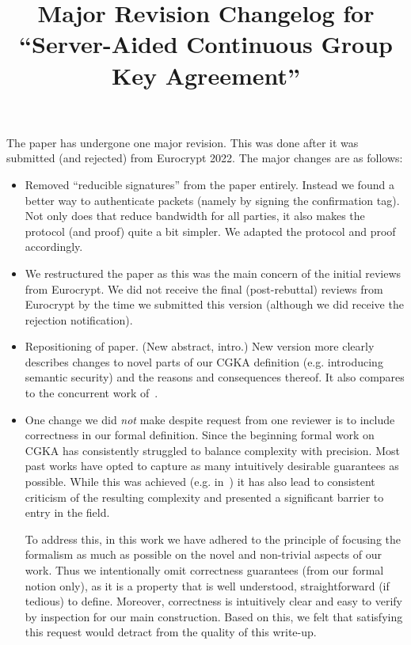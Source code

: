 \documentclass[letterpaper,10pt]{article}
\title{Major Revision Changelog for ``Server-Aided Continuous Group Key Agreement''}
\author{
} %
\begin{document}
{
	\def\addcontentsline#1#2#3{}
	\maketitle }

The paper has undergone one major revision. This was done after it was
submitted (and rejected) from Eurocrypt 2022. The major changes are as
follows:
\begin{itemize}
\item Removed ``reducible signatures'' from the paper entirely. Instead we
    found a better way to authenticate packets (namely by signing the
    confirmation tag). Not only does that reduce bandwidth for all parties,
    it also makes the protocol (and proof) quite a bit simpler.  We adapted
    the protocol and proof accordingly.
\item We restructured the paper as this was the main concern of the initial
    reviews from Eurocrypt. We did not receive the final (post-rebuttal)
    reviews from Eurocrypt by the time we submitted this version (although
    we did receive the rejection notification).
\item Repositioning of paper. (New abstract, intro.) New version more
    clearly describes changes to novel parts of our CGKA definition (e.g.
    introducing semantic security) and the reasons and consequences
    thereof. It also compares to the concurrent work
    of~\cite{hashimoto2021cmpke}.
\item One change we did \emph{not} make despite request from one reviewer
    is to include correctness in our formal definition. Since the beginning
    formal work on CGKA has consistently struggled to balance complexity
    with precision. Most past works have opted to capture as many
    intuitively desirable guarantees as possible. While this was achieved
    (e.g. in~\cite{EPRINT:AlwJosMul20}) it has also lead to consistent
    criticism of the resulting complexity and presented a significant
    barrier to entry in the field.

    To address this, in this work we have adhered to the principle of
    focusing the formalism as much as possible on the novel and non-trivial
    aspects of our work. Thus we intentionally omit correctness guarantees
    (from our formal notion only), as it is a property that is well
    understood, straightforward (if tedious) to define. Moreover,
    correctness is intuitively clear and easy to verify by inspection for
    our main construction. Based on this, we felt that satisfying this
    request would detract from the quality of this write-up.
\end{itemize}
\end{document}
